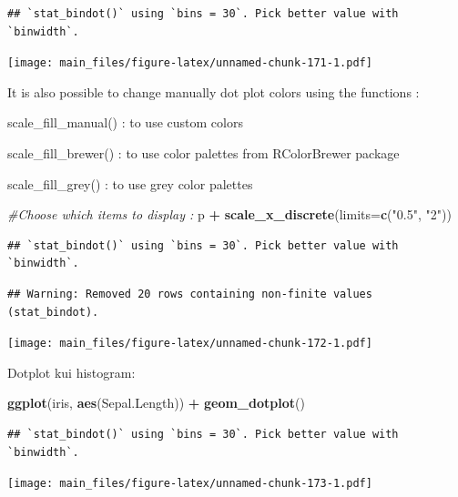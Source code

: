 \documentclass[]{book}
\newenvironment{Shaded}{\begin{snugshade}}{\end{snugshade}}
\newcommand{\KeywordTok}[1]{\textcolor[rgb]{0.13,0.29,0.53}{\textbf{#1}}}
\newcommand{\DataTypeTok}[1]{\textcolor[rgb]{0.13,0.29,0.53}{#1}}
\newcommand{\StringTok}[1]{\textcolor[rgb]{0.31,0.60,0.02}{#1}}
\newcommand{\CommentTok}[1]{\textcolor[rgb]{0.56,0.35,0.01}{\textit{#1}}}
\newcommand{\OperatorTok}[1]{\textcolor[rgb]{0.81,0.36,0.00}{\textbf{#1}}}
\newcommand{\NormalTok}[1]{#1}
\begin{document}
\begin{verbatim}
## `stat_bindot()` using `bins = 30`. Pick better value with `binwidth`.
\end{verbatim}

\texttt{[image: main\_files/figure-latex/unnamed-chunk-171-1.pdf]}

It is also possible to change manually dot plot colors using the
functions :

scale\_fill\_manual() : to use custom colors

scale\_fill\_brewer() : to use color palettes from RColorBrewer package

scale\_fill\_grey() : to use grey color palettes

\begin{Shaded}
\begin{Highlighting}[]
\CommentTok{#Choose which items to display :}
\NormalTok{p }\OperatorTok{+}\StringTok{ }\KeywordTok{scale_x_discrete}\NormalTok{(}\DataTypeTok{limits=}\KeywordTok{c}\NormalTok{(}\StringTok{"0.5"}\NormalTok{, }\StringTok{"2"}\NormalTok{))}
\end{Highlighting}
\end{Shaded}

\begin{verbatim}
## `stat_bindot()` using `bins = 30`. Pick better value with `binwidth`.
\end{verbatim}

\begin{verbatim}
## Warning: Removed 20 rows containing non-finite values (stat_bindot).
\end{verbatim}

\texttt{[image: main\_files/figure-latex/unnamed-chunk-172-1.pdf]}

Dotplot kui histogram:

\begin{Shaded}
\begin{Highlighting}[]
\KeywordTok{ggplot}\NormalTok{(iris, }\KeywordTok{aes}\NormalTok{(Sepal.Length)) }\OperatorTok{+}\StringTok{ }\KeywordTok{geom_dotplot}\NormalTok{()}
\end{Highlighting}
\end{Shaded}

\begin{verbatim}
## `stat_bindot()` using `bins = 30`. Pick better value with `binwidth`.
\end{verbatim}

\texttt{[image: main\_files/figure-latex/unnamed-chunk-173-1.pdf]}
\end{document}
